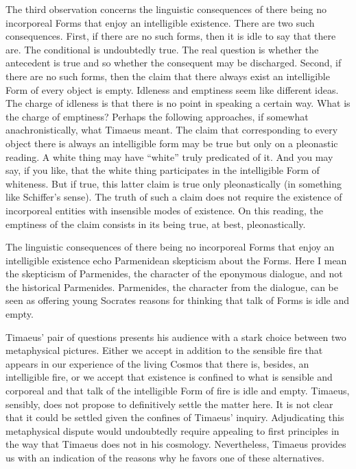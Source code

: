 The third observation concerns the linguistic consequences of there being no incorporeal Forms that enjoy an intelligible existence. There are two such consequences. First, if there are no such forms, then it is idle to say that there are. The conditional is undoubtedly true. The real question is whether the antecedent is true and so whether the consequent may be discharged. Second, if there are no such forms, then the claim that there always exist an intelligible Form of every object is empty. Idleness and emptiness seem like different ideas. The charge of idleness is that there is no point in speaking a certain way. What is the charge of emptiness? Perhaps the following approaches, if somewhat anachronistically, what Timaeus meant. The claim that corresponding to every object there is always an intelligible form may be true but only on a pleonastic reading. A white thing may have ``white'' truly predicated of it. And you may say, if you like, that the white thing participates in the intelligible Form of whiteness. But if true, this latter claim is true only pleonastically (in something like Schiffer's \citeyear{Schiffer:1987aa} sense). The truth of such a claim does not require the existence of incorporeal entities with insensible modes of existence. On this reading, the emptiness of the claim consists in its being true, at best, pleonastically.

The linguistic consequences of there being no incorporeal Forms that enjoy an intelligible existence echo Parmenidean skepticism about the Forms. Here I mean the skepticism of Parmenides, the character of the eponymous dialogue, and not the historical Parmenides. Parmenides, the character from the dialogue, can be seen as offering young Socrates reasons for thinking that talk of Forms is idle and empty.

Timaeus' pair of questions presents his audience with a stark choice between two metaphysical pictures. Either we accept in addition to the sensible fire that appears in our experience of the living Cosmos that there is, besides, an intelligible fire, or we accept that existence is confined to what is sensible and corporeal and that talk of the intelligible Form of fire is idle and empty. Timaeus, sensibly, does not propose to definitively settle the matter here. It is not clear that it could be settled given the confines of Timaeus' inquiry. Adjudicating this metaphysical dispute would undoubtedly require appealing to first principles in the way that Timaeus does not in his cosmology. Nevertheless, Timaeus provides us with an indication of the reasons why he favors one of these alternatives.

